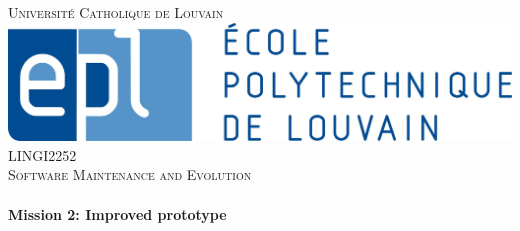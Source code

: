 \pagestyle{fancy}
\fancyhf{}
\cfoot{\thepage}


    \begin{titlepage}
        \center %


        \textsc{\LARGE Université Catholique de Louvain }\\[0.8cm] %
        \includegraphics[scale=0.45]{epl.jpg}
        \\[1.5cm]
        \textsc{\Large LINGI2252}\\[0.5cm] %
        \textsc{\large Software Maintenance and Evolution}\\[0.8cm] %


        \HRule \\[0.4cm]
        { \huge \bfseries Mission 2: Improved prototype}\\[0.2cm] %
        \HRule \\[1.5cm]



\end{titlepage}
